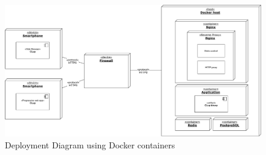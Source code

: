 \begin{figure}[H]
    \centering
    \includegraphics[width=1\textwidth]{Images/deployment-2.pdf}
    \caption{Deployment Diagram using Docker containers}
\end{figure}


